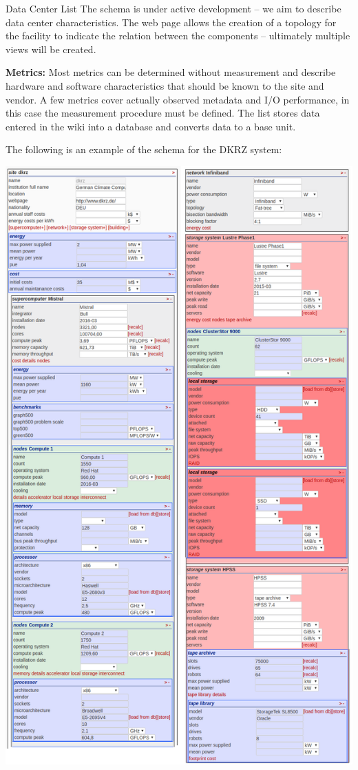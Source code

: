 \documentclass[portrait,a0paper,fontscale=0.4]{baposter}
\begin{document}
\begin{poster}
\begin{posterbox}[name=schedule,column=2,span=1, above=bottom, below=io500]{Data Center List}
The schema is under active development -- we aim to describe data center characteristics.
The web page allows the creation of a topology for the facility to indicate the relation between the components -- ultimately multiple views will be created.


\textbf{Metrics:} Most metrics can be determined without measurement and describe hardware and software characteristics that should be known to the site and vendor. A few metrics cover actually observed metadata and I/O performance, in this case the measurement procedure must be defined.
The list stores data entered in the wiki into a database and converts data to a base unit.

The following is an example of the schema for the DKRZ system:

\vspace*{-0.65em}

\includegraphics[width=\textwidth]{schema}


\end{posterbox}
\end{poster}
\end{document}
